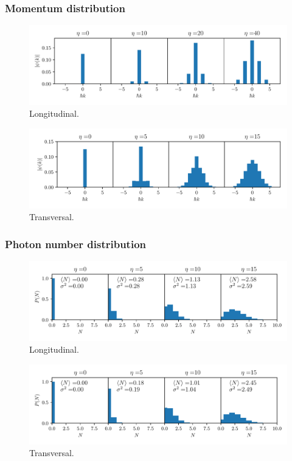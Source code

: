 \documentclass[pdflatex,compress]{beamer}
\begin{document}
\begin{frame}
\frametitle{Momentum distribution}
\vspace{-1em}
\begin{figure}
\centering
\includegraphics[width=.9\textwidth]{images/mom_long.pdf}
\vspace*{-6mm}
\caption{Longitudinal.}
\end{figure}
\vspace{-2em}
\begin{figure}
\centering
\includegraphics[width=.9\textwidth]{images/mom_trans.pdf}
\vspace*{-6mm}
\caption{Transversal.}
\end{figure}
\end{frame}

\begin{frame}
\frametitle{Photon number distribution}
\vspace{-1em}
\begin{figure}
\centering
\includegraphics[width=.9\textwidth]{images/pho_dens_long.pdf}
\vspace*{-6mm}
\caption{Longitudinal.}
\end{figure}
\vspace{-2em}
\begin{figure}
\centering
\includegraphics[width=.9\textwidth]{images/pho_dens_trans.pdf}
\vspace*{-6mm}
\caption{Transversal.}
\end{figure}
\end{frame}
\end{document}
